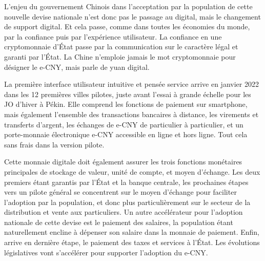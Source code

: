 L’enjeu du gouvernement Chinois dans l’acceptation par la population de cette nouvelle devise nationale n’est donc pas le passage au digital, mais le changement de support digital. Et cela passe, comme dans toutes les économies du monde, par la confiance puis par l’expérience utilisateur. La confiance en une cryptomonnaie d’État passe par la communication sur le caractère légal et garanti par l’État. La Chine n’emploie jamais le mot cryptomonnaie pour désigner le e-CNY, mais parle de yuan digital. 

La première interface utilisateur intuitive et pensée service arrive en janvier 2022 dans les 12 premières villes pilotes, juste avant l’essai à grande échelle pour les JO d’hiver à Pékin. Elle comprend les fonctions de paiement sur smartphone, mais également l’ensemble des transactions bancaires à distance, les virements et transferts d’argent, les échanges de e-CNY de particulier à particulier, et un porte-monnaie électronique e-CNY accessible en ligne et hors ligne. Tout cela sans frais dans la version pilote. 

Cette monnaie digitale doit également assurer les trois fonctions monétaires principales de stockage de valeur, unité de compte, et moyen d’échange. Les deux premiers étant garantis par l’État et la banque centrale, les prochaines étapes vers un pilote général se concentrent sur le moyen d’échange pour faciliter l’adoption par la population, et donc plus particulièrement sur le secteur de la distribution et vente aux particuliers. Un autre accélérateur pour l’adoption nationale de cette devise est le paiement des salaires, la population étant naturellement encline à dépenser son salaire dans la monnaie de paiement. Enfin, arrive en dernière étape, le paiement des taxes et services à l’État. Les évolutions législatives vont s’accélérer pour supporter l’adoption du e-CNY. 

